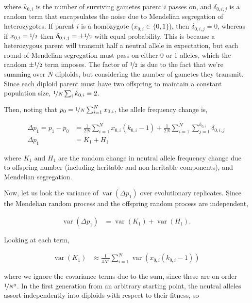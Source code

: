 \documentclass[11pt]{article}
\DeclareMathOperator{\var}{var}
\begin{document}
where $k_{0,i}$ is the number of surviving gametes parent $i$ passes on, and
$\delta_{0,i,j}$ is a random term that encapsulates the noise due to Mendelian
segregation of heterozygotes. If parent $i$ is a homozygote ($x_{0,i} \in \{0,
1\}$), then $\delta_{0,i,j} = 0$, whereas if $x_{0,i} = \nicefrac{1}{2}$ then
$\delta_{0,i,j} = \pm \nicefrac{1}{2}$ with equal probability. This is because
a heterozygous parent will transmit half a neutral allele in expectation, but
each round of Mendelian segregation must pass on either 0 or 1 alleles, which
the random $\pm \nicefrac{1}{2}$ term imposes. The factor of $\nicefrac{1}{2}$
is due to the fact that we're summing over $N$ diploids, but considering the
number of gametes they transmit. Since each diploid parent must have two
offspring to maintain a constant population size, $\nicefrac{1}{N} \sum_i
k_{0,i} = 2$. 

Then, noting that $p_0 = \nicefrac{1}{N} \sum_{i=1}^N x_{0,i}$, the allele
frequency change is,

\begin{align}
  \Delta p_1 = p_1 - p_0 &= \frac{1}{2N} \sum_{i=1}^N x_{0,i} (k_{0,i} - 1) + \frac{1}{2N} \sum_{i=1}^N \sum_{j=1}^{k_{0,i}} \delta_{0,i,j} \\
  \Delta p_1 &= K_1 + H_1
\end{align}

where $K_1$ and $H_1$ are the random change in neutral allele frequency change
due to offspring number (including heritable and non-heritable components), and
Mendelian segregation.

Now, let us look the variance of $\var(\Delta p_1)$ over evolutionary
replicates. Since the Mendelian random process and the offspring random process
are independent,

\begin{align}
  \var(\Delta p_1) &= \var(K_1) + \var(H_1).
\end{align}

Looking at each term,

\begin{align}
  \var(K_1) &\approx \frac{1}{4N^2} \sum_{i=1}^N \var\left(x_{0,i} (k_{0,i} - 1) \right)
\end{align}

where we ignore the covariance terms due to the sum, since these are on order
$\nicefrac{1}{N^3}$. In the first generation from an arbitrary starting point,
the neutral alleles assort independently into diploids with respect to their
fitness, so
\end{document}
